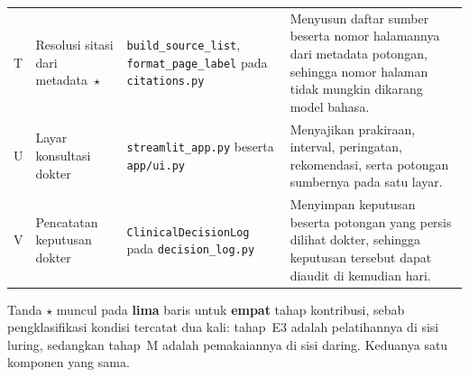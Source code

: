\begin{longtable}{@{}p{1.0cm}p{2.9cm}p{3.5cm}p{5.1cm}@{}}
T & Resolusi sitasi dari metadata~$\star$ & \texttt{build\_\allowbreak source\_\allowbreak list}, \texttt{format\_\allowbreak page\_\allowbreak label} pada \texttt{citations.py} & Menyusun daftar sumber beserta nomor halamannya dari metadata potongan, sehingga nomor halaman tidak mungkin dikarang model bahasa. \\[2pt]

U & Layar konsultasi dokter & \texttt{streamlit\_\allowbreak app.py} beserta \texttt{app/ui.py} & Menyajikan prakiraan, interval, peringatan, rekomendasi, serta potongan sumbernya pada satu layar. \\[2pt]

V & Pencatatan keputusan dokter & \texttt{ClinicalDecisionLog} pada \texttt{decision\_\allowbreak log.py} & Menyimpan keputusan beserta potongan yang persis dilihat dokter, sehingga keputusan tersebut dapat diaudit di kemudian hari. \\

\end{longtable}

{\footnotesize Tanda $\star$ muncul pada \textbf{lima} baris untuk \textbf{empat} tahap kontribusi, sebab pengklasifikasi kondisi tercatat dua kali: tahap~E3 adalah pelatihannya di sisi luring, sedangkan tahap~M adalah pemakaiannya di sisi daring. Keduanya satu komponen yang sama.\par}
